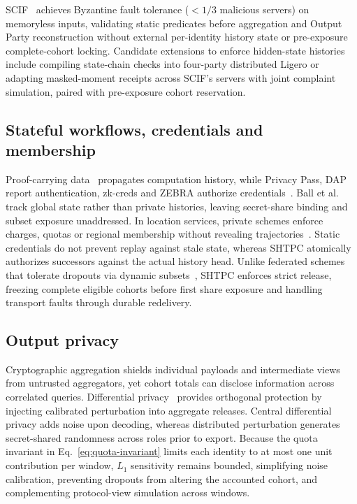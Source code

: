 \documentclass[conference,compsoc]{IEEEtran}
\theoremstyle{definition}
\numberwithin{equation}{section}
\numberwithin{table}{section}
\numberwithin{figure}{section}
\theoremstyle{plain}
\begin{document}
SCIF~\cite{Su2025SCIF} achieves Byzantine fault tolerance (\(<1/3\) malicious servers) on memoryless inputs, validating static predicates before aggregation and Output Party reconstruction without external per-identity history state or pre-exposure complete-cohort locking. Candidate extensions to enforce hidden-state histories include compiling state-chain checks into four-party distributed Ligero or adapting masked-moment receipts across SCIF's servers with joint complaint simulation, paired with pre-exposure cohort reservation.

\subsection{Stateful workflows, credentials and membership}
Proof-carrying data~\cite{Chiesa2010PCD,Bitansky2012Recursive} propagates computation history, while Privacy Pass, DAP report authentication, zk-creds and ZEBRA authorize credentials~\cite{Davidson2024PrivacyPass,Priebe2023ReportAuth,Rosenberg2023ZKCreds,Rathee2022Zebra}. Ball et al.~\cite{Ball2024Stateful} track global state rather than private histories, leaving secret-share binding and subset exposure unaddressed. In location services, private schemes enforce charges, quotas or regional membership without revealing trajectories~\cite{Popa2009VPriv,Balasch2010PrETP,Popa2011PrivStats,Ernstberger2025ZKLP}. Static credentials do not prevent replay against stale state, whereas SHTPC atomically authorizes successors against the actual history head. Unlike federated schemes that tolerate dropouts via dynamic subsets~\cite{Bonawitz2017SecureAggregation,Ma2023Flamingo,Bell2020SecAggPlus,So2022LightSecAgg}, SHTPC enforces strict release, freezing complete eligible cohorts before first share exposure and handling transport faults through durable redelivery.

\subsection{Output privacy}
Cryptographic aggregation shields individual payloads and intermediate views from untrusted aggregators, yet cohort totals can disclose information across correlated queries. Differential privacy~\cite{Dwork2014algorithmic,Bagdasaryan2022SparseHeatmaps} provides orthogonal protection by injecting calibrated perturbation into aggregate releases. Central differential privacy adds noise upon decoding, whereas distributed perturbation generates secret-shared randomness across roles prior to export. Because the quota invariant in Eq.~\eqref{eq:quota-invariant} limits each identity to at most one unit contribution per window, \(L_1\) sensitivity remains bounded, simplifying noise calibration, preventing dropouts from altering the accounted cohort, and complementing protocol-view simulation across windows.
\end{document}
